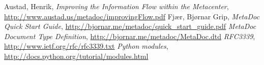 \newpage
\begin{thebibliography}{99}
     Austad, Henrik, \textit{Improving the Information
    Flow within the Metacenter},
    \url{http://www.austad.us/metadoc/improvingFlow.pdf}
     Fjær, Bjørnar Grip, \textit{MetaDoc Quick Start
    Guide}, \url{http://bjornar.me/metadoc/quick_start_guide.pdf}
     \textit{MetaDoc Document Type Definition}, 
        \url{http://bjornar.me/metadoc/MetaDoc.dtd}
     \textit{RFC3339}, \url{http://www.ietf.org/rfc/rfc3339.txt}
     \textit{Python modules},
    \url{http://docs.python.org/tutorial/modules.html}
\end{thebibliography}
